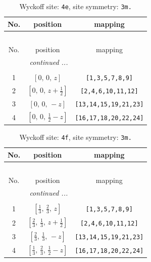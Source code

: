 \documentclass[fleqn,8pt]{jsarticle}
\begin{document}
\begin{longtable}{ccc}
\caption{Wyckoff site: {\tt 4e}, site symmetry: {\tt 3m.}}
 \\
 \hline \hline
No. & position & mapping \\ \hline \endfirsthead

\multicolumn{2}{l}{\tablename\ \thetable{}} \\
 \hline \hline
No. & position & mapping \\ \hline \endhead

 \hline \hline
\multicolumn{2}{r}{\footnotesize\it continued ...} \\ \endfoot

 \hline \hline
\multicolumn{2}{r}{} \\ \endlastfoot

1 & $\left[ 0,\, 0,\, z \right]$ & {\tt [1,3,5,7,8,9]} \\ \hline
2 & $\left[ 0,\, 0,\, z + \frac{1}{2} \right]$ & {\tt [2,4,6,10,11,12]} \\ \hline
3 & $\left[ 0,\, 0,\, - z \right]$ & {\tt [13,14,15,19,21,23]} \\ \hline
4 & $\left[ 0,\, 0,\, \frac{1}{2} - z \right]$ & {\tt [16,17,18,20,22,24]} \\
\end{longtable}
\renewcommand{\arraystretch}{1.2}
\begin{longtable}{ccc}
\caption{Wyckoff site: {\tt 4f}, site symmetry: {\tt 3m.}}
 \\
 \hline \hline
No. & position & mapping \\ \hline \endfirsthead

\multicolumn{2}{l}{\tablename\ \thetable{}} \\
 \hline \hline
No. & position & mapping \\ \hline \endhead

 \hline \hline
\multicolumn{2}{r}{\footnotesize\it continued ...} \\ \endfoot

 \hline \hline
\multicolumn{2}{r}{} \\ \endlastfoot

1 & $\left[ \frac{1}{3},\, \frac{2}{3},\, z \right]$ & {\tt [1,3,5,7,8,9]} \\ \hline
2 & $\left[ \frac{2}{3},\, \frac{1}{3},\, z + \frac{1}{2} \right]$ & {\tt [2,4,6,10,11,12]} \\ \hline
3 & $\left[ \frac{2}{3},\, \frac{1}{3},\, - z \right]$ & {\tt [13,14,15,19,21,23]} \\ \hline
4 & $\left[ \frac{1}{3},\, \frac{2}{3},\, \frac{1}{2} - z \right]$ & {\tt [16,17,18,20,22,24]} \\
\end{longtable}
\end{document}
